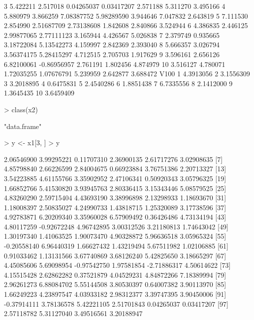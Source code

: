\documentclass[12pt]{article}
\begin{document}
\begin{Schunk}
\begin{Soutput}
3  5.422211 2.517018 0.04265037  0.03417207 2.571188 5.311270 3.495166
4  5.880979 3.866259 7.08387752  5.98289590 3.944646 7.047832 2.643819
5  7.111530 2.854990 2.51687709  2.73138608 1.842608 2.840866 3.524944
6  4.386835 2.446125 2.99877065  2.77111123 3.165944 4.426567 5.026838
7  2.379749 0.935665 3.18722084  5.13542273 4.159997 2.842369 2.393040
8  5.666357 3.026794 3.56374175  5.28415297 4.712515 2.705703 1.917629
9  3.596161 2.656126 6.82100061 -0.86956957 2.761191 1.802456 4.874979
10 3.516127 4.780071 1.72035255  1.07676791 5.239959 2.642877 3.688472
        V100
1  4.3913056
2  3.1556309
3  3.2018895
4  0.6475831
5  2.4540286
6  1.8851438
7  6.7335556
8  2.1412000
9  1.3645435
10 3.6459409
\end{Soutput}
\begin{Sinput}
> class(x2)
\end{Sinput}
\begin{Soutput}
[1] "data.frame"
\end{Soutput}
\begin{Sinput}
> y <- x1[3, ] 
> y
\end{Sinput}
\begin{Soutput}
  [1]  2.06546900  3.99295221  0.11707310  2.36900135  2.61717276  3.02908635
  [7]  4.85798840  2.66226599  2.84004675  0.66923884  3.76751386  2.20713327
 [13]  3.54223885  4.61155766  3.35902952  2.47106341  0.50920343  3.05796325
 [19]  1.66852766  5.41530820  3.93945763  2.80336415  3.15343446  5.08579525
 [25]  4.83260290  2.59715404  4.43693190  3.38996898  2.13298933  1.18693670
 [31]  1.18008397  2.50835027  4.24990733  1.43818715  1.25320089  3.17738596
 [37]  4.92783871  6.20209340  3.35960028  6.57909492  0.36426486  4.73134194
 [43]  4.80117259 -0.92672248  4.96742895  3.00312526  3.21180813  1.74643042
 [49]  1.30197340  1.41063525  1.90073470  4.90328872  5.96636518  3.05965324
 [55] -0.20558140  6.96440319  1.66627432  1.43219494  5.67511982  1.02106885
 [61]  0.91033462  1.13131566  3.67740869  3.68126240  5.42825650  3.18665297
 [67]  4.45085606  5.69098954 -0.97542750  1.97581854 -2.71886317  4.50614622
 [73]  4.15515428  2.62862282  0.37521879  4.04529231  4.84872266  7.18389994
 [79]  2.96261273  6.88084702  5.55144508  3.80530397  0.64007382  3.90113970
 [85]  1.66249223  4.23897547  4.03933182  2.98312377  3.39747395  3.90450006
 [91] -0.37914111  3.78136578  5.42221105  2.51701843  0.04265037  0.03417207
 [97]  2.57118782  5.31127040  3.49516561  3.20188947
\end{Soutput}
\begin{Sinput}

\end{Sinput}
\end{Schunk}
\end{document}
